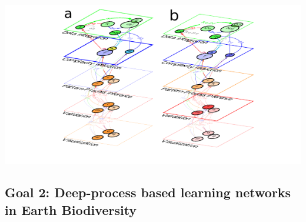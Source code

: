 \documentclass[authoryear,1p,12pt]{elsarticle}
\begin{document}
    
  \begin{center}
        \hspace{-0.75 in}\includegraphics[width=1.1 \textwidth]{Figure4}
     \end{center}
     \vspace{-0.15 in}
     \caption{{\small {\bf Figure 2: Automated data-driven research
           platform:} {\bf a)} Automated data-driven prototype
         containing initially five layers: Data Integration,
         Complexity reduction, Pattern-process inference, Validation,
         and Visualization (Reporting generation not shown). Nodes and
         links represent algorithms and connections between two
         algorithms, respectively. The inter-layer interactions will
         be implemented using the open-Renku-Swiss Data Science Center
         platform\footnote{\href{https://renku.readthedocs.io/en/latest/}{Renku}}. The
         intra-layer interactions will be developed initially in julia
         language (other languages will come into play during the
         development of each layer). {\bf b)} A julia computing
         language prototype of an automated research platform. Nodes
         and links in each layer represent julia packages and
         interactions between two packages, respectively. The figure
         shows the julia packages for the Data integration layer
         containing the packages "Retriever.jl" ({\bf Re}), "Query.jl"
         ({\bf Qu}), "MySQL.jl" ({\bf My}), "SQlite.jl" ({\bf lite}),
         and "DataFrames.jl" ({\bf df}).}}

     \subsection{Goal 2: Deep-process based learning networks in Earth Biodiversity}
     
\end{document}
